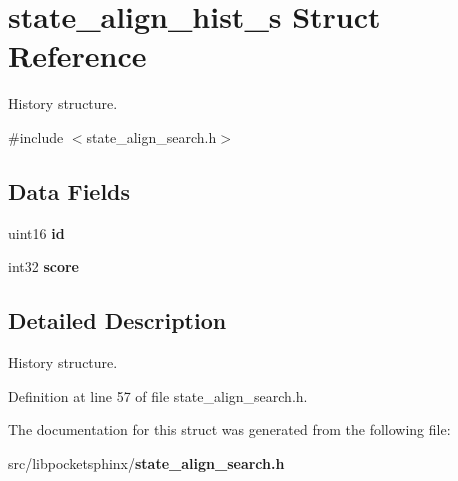 \section{state\-\_\-align\-\_\-hist\-\_\-s Struct Reference}
\label{structstate__align__hist__s}


History structure.  




{\ttfamily \#include $<$state\-\_\-align\-\_\-search.\-h$>$}

\subsection*{Data Fields}
\begin{DoxyCompactItemize}
\item 
uint16 {\bfseries id}\label{structstate__align__hist__s_a74cb4b079e03059eb0b02cb17bcadb5e}

\item 
int32 {\bfseries score}\label{structstate__align__hist__s_aa8c7206b0491eefdfa2eaaf5a2834652}

\end{DoxyCompactItemize}


\subsection{Detailed Description}
History structure. 

Definition at line 57 of file state\-\_\-align\-\_\-search.\-h.



The documentation for this struct was generated from the following file\-:\begin{DoxyCompactItemize}
\item 
src/libpocketsphinx/{\bf state\-\_\-align\-\_\-search.\-h}\end{DoxyCompactItemize}
